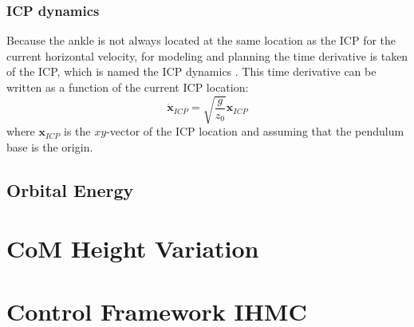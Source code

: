 \subsubsection{\ac{ICP} dynamics}
Because the ankle is not always located at the same location as the \ac{ICP} for the current horizontal velocity, for modeling and planning the time derivative is taken of the \ac{ICP}, which is named the \ac{ICP} dynamics \cite{koolen2012capturability}. This time derivative can be written as a function of the current \ac{ICP} location:
\begin{equation}
\boldsymbol{\dot{x}}_{ICP}=\sqrt{ \frac{g}{z_0}}\boldsymbol{x}_{ICP} 
\label{eq:cp}
\end{equation}
where $\boldsymbol{x}_{ICP}$ is the $xy$-vector of the \ac{ICP} location and assuming that the pendulum base is the origin.

\subsection{Orbital Energy}
\Eorbit  \cite{pratt2007derivation}

\section{CoM Height Variation}

\section{Control Framework IHMC}